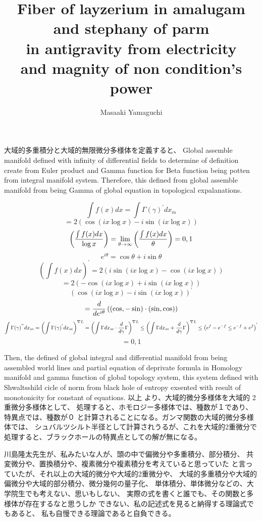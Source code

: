 \documentclass{jsarticle}
\begin{document}
{\title{Fiber of layzerium in amalugam and stephany of parm \\
in antigravity from electricity \\
and magnity of non condition's power}
\author{Masaaki Yamaguchi}

   大域的多重積分と大域的無限微分多様体を定義すると、
   Global assemble manifold defined with infinity of differential
   fields to determine of definition create from Euler product and
   Gamma function for Beta function being potten from integral manifold
   system. Therefore, this defined from global assemble manifold from
   being Gamma of global equation in topological expalanations.

   $$ \int f(x)dx = \int \Gamma(\gamma)^{'}dx_m $$
   $$ = 2 (\cos (i x \log x) - i \sin(i x \log x)) $$
   $$ \left({{\int f(x) dx} \over \log x}\right) = \lim_{\theta \to \infty}
    \left({{\int f(x) dx} \over \theta}\right) = 0,1 $$
    $$ e^{i \theta} = \cos \theta + i \sin \theta $$
    $$ \left({\int f(x) dx}\right)^{'} = 2 (i \sin(i x \log x) - \cos (i x \log
    x)) $$
    $$ = 2(- \cos(i x \log x) + i \sin(i x \log x)) $$
    $$ (\cos (i x \log x) - i \sin(i x \log x))^{'} $$
    $$ = {d \over {d {e^{i\theta}}}}\left((\cos, - \sin )\cdot
    (\sin, \cos)\right)  $$
    $$ \int \Gamma(\gamma)^{''}dx_m = \left({\int \Gamma(\gamma)^{'}}dx_m
    \right)^{\nabla L} = \left({{\int \Gamma dx_m} \cdot {{d \over d\gamma}
    \Gamma}}\right)^{\nabla L} \le 
    \left({\int \Gamma dx_m + {d \over d\gamma}\Gamma}\right)^{\nabla L} \le 
    \left({e^{f} - e^{-f}} \le {e^{-f} + e^{f}}\right)^{'}  $$
    $$ = 0,1 $$

    Then, the defined of global integral and differential manifold
    from being assembled world lines and partial equation of deprivate
    formula in Homology manifold and gamma function of global topology
    system, this system defined with Shwaltsshild cicle of norm from
    black hole of entropy exsented with result of monotonicity for
    constant of equations.
    以上 より、大域的微分多様体を大域的 2重微分多様体として、
    処理すると、ホモロジー多様体では、種数が１であり、特異点では、種数が０
    と計算されることになる。ガンマ関数の大域的微分多様体では、
    シュバルツシルト半径として計算されうるが、これを大域的2重微分で
    処理すると、ブラックホールの特異点としての解が無になる。

    川島隆太先生が、私みたいな人が、頭の中で偏微分や多重積分、部分積分、
    共変微分や、置換積分や、複素微分や複素積分を考えていると思っていた
    と言っていたが、それ以上の大域的微分や大域的2重微分や、
    大域的多重積分や大域的偏微分や大域的部分積分、微分幾何の量子化、
    単体積分、単体微分などの、大学院生でも考えない、思いもしない、
    実際の式を書くと誰でも、その関数と多様体が存在するなと思うしか
    できない、私の記述式を見ると納得する理論式でもあると、
    私も自慢できる理論であると自負できる。

}
\end{document}
